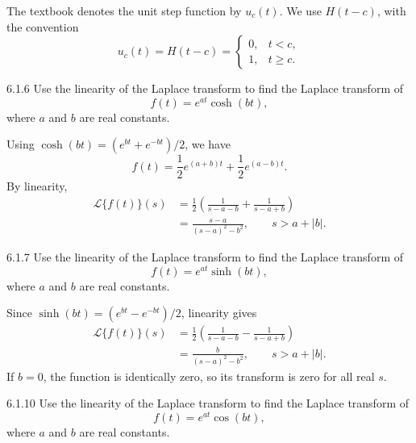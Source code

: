 \documentclass[11pt,oneside]{article}
\begin{document}

\begin{notation}
The textbook denotes the unit step function by $u_c(t)$. We use $H(t-c)$, with the convention
\[
    u_c(t)=H(t-c)=
    \begin{cases}
        0, & t<c,\\
        1, & t\geq c.
    \end{cases}
\]
\end{notation}

\begin{problem}{6.1.6}
Use the linearity of the Laplace transform to find the Laplace transform of
\[
    f(t)=e^{at}\cosh(bt),
\]
where $a$ and $b$ are real constants.
\end{problem}

\begin{solution}
Using $\cosh(bt)=(e^{bt}+e^{-bt})/2$, we have
\[
    f(t)=\frac12e^{(a+b)t}+\frac12e^{(a-b)t}.
\]
By linearity,
\[
    \begin{aligned}
    \mathcal{L}\{f(t)\}(s)
      &=\frac12\left(\frac{1}{s-a-b}+\frac{1}{s-a+b}\right)\\
      &=\boxed{\frac{s-a}{(s-a)^2-b^2}}, \qquad s>a+|b|.
    \end{aligned}
\]
\end{solution}

\begin{problem}{6.1.7}
Use the linearity of the Laplace transform to find the Laplace transform of
\[
    f(t)=e^{at}\sinh(bt),
\]
where $a$ and $b$ are real constants.
\end{problem}

\begin{solution}
Since $\sinh(bt)=(e^{bt}-e^{-bt})/2$, linearity gives
\[
    \begin{aligned}
    \mathcal{L}\{f(t)\}(s)
      &=\frac12\left(\frac{1}{s-a-b}-\frac{1}{s-a+b}\right)\\
      &=\boxed{\frac{b}{(s-a)^2-b^2}}, \qquad s>a+|b|.
    \end{aligned}
\]
If $b=0$, the function is identically zero, so its transform is zero for all real $s$.
\end{solution}

\begin{problem}{6.1.10}
Use the linearity of the Laplace transform to find the Laplace transform of
\[
    f(t)=e^{at}\cos(bt),
\]
where $a$ and $b$ are real constants.
\end{problem}
\end{document}
